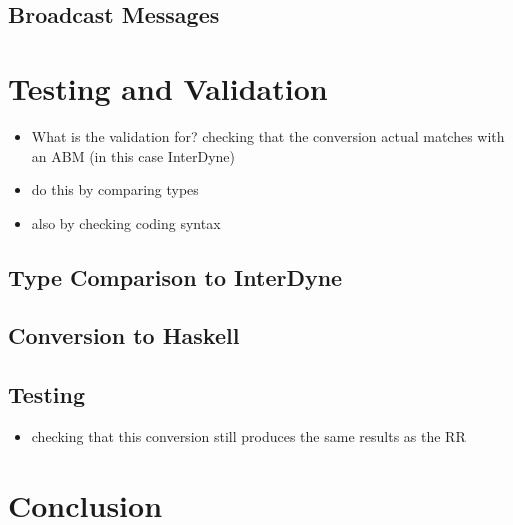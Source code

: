 \documentclass{article}
\begin{document}
\subsection{Broadcast Messages}


\section{Testing and Validation}

\begin{itemize}
  \item What is the validation for? checking that the conversion actual matches with an ABM (in this case InterDyne)
  \item do this by comparing types 
  \item also by checking coding syntax 
\end{itemize}


\subsection{Type Comparison to InterDyne}


\subsection{Conversion to Haskell}

\subsection{Testing}

\begin{itemize}
  \item checking that this conversion still produces the same results as the RR 
\end{itemize}



\section{Conclusion}
\end{document}
